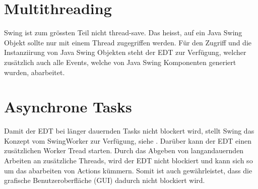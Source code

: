   \section{Multithreading}
  
  Swing ist zum grössten Teil nicht thread-save. Das heisst, auf ein Java Swing
  Objekt sollte nur mit einem Thread zugegriffen werden. Für den Zugriff und
  die Instanziirung von Java Swing Objekten steht der \ac{EDT} zur Verfügung,
  welcher zusätzlich auch alle Events, welche von Java Swing Komponenten
  generiert wurden, abarbeitet.
  
  \section{Asynchrone Tasks}
  
  Damit der \ac{EDT} bei länger dauernden Tasks nicht blockert wird, stellt
  Swing das Konzept vom SwingWorker zur Verfügung, siehe \cite{SwingWorker}.
  Darüber kann der \ac{EDT} einen zusätzlichen Worker Tread starten. Durch das
  Abgeben von langandauernden Arbeiten an zusätzliche Threads, wird der
  \ac{EDT} nicht blockiert und kann sich so um das abarbeiten von Actions
  kümmern. Somit ist auch gewährleistet, dass die grafische Benutzeroberfläche
  (\acs{GUI}) dadurch nicht blockiert wird.
